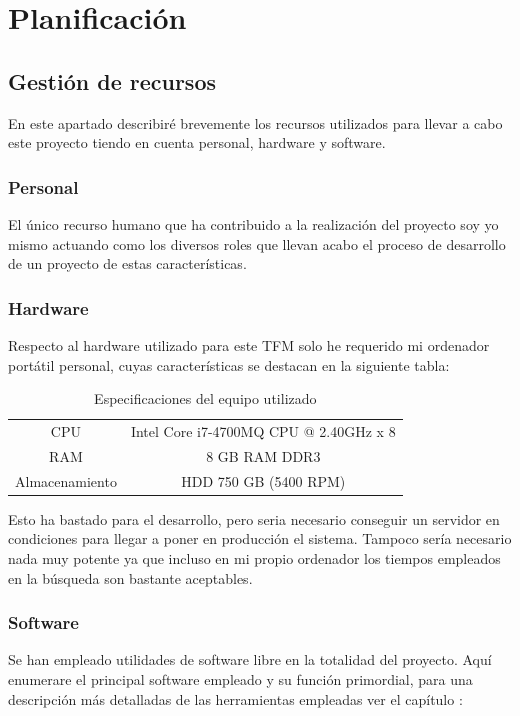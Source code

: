 \chapter{Planificación}

\section{Gestión de recursos}
En este apartado describiré brevemente los recursos utilizados para llevar a cabo este proyecto tiendo en cuenta personal, hardware y software.

\subsection{Personal}
El único recurso humano que ha contribuido a la realización del proyecto soy yo mismo actuando como los diversos roles que llevan acabo el proceso de desarrollo de un proyecto de estas características.

\subsection{Hardware}
Respecto al hardware utilizado para este \acrshort{TFM} solo he requerido mi ordenador portátil personal, cuyas características se destacan en la siguiente tabla:

\begin{table} [h!]
\centering
\begin{tabular}{c c}
	\hline
	CPU & Intel \textregistered  Core \texttrademark  i7-4700MQ CPU @ 2.40GHz x 8\\
	RAM & 8 GB RAM DDR3\\
	Almacenamiento & HDD 750 GB (5400 RPM)\\
	\hline
\end{tabular}
	\caption{Especificaciones del equipo utilizado}
\end{table}

Esto ha bastado para el desarrollo, pero seria necesario conseguir un servidor en condiciones para llegar a poner en producción el sistema. Tampoco sería necesario nada muy potente ya que incluso en mi propio ordenador los tiempos empleados en la búsqueda son bastante aceptables.

\subsection{Software}
Se han empleado utilidades de software libre en la totalidad del proyecto. Aquí enumerare el principal software empleado y su función primordial, para una descripción más detalladas de las herramientas empleadas ver el capítulo :

